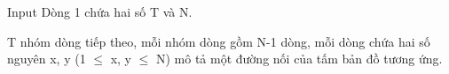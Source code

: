 Input
Dòng 1 chứa hai số T và N.  

   T nhóm dòng tiếp theo, mỗi nhóm dòng gồm N-1 dòng, mỗi dòng chứa hai số nguyên x, y (1  $\le$  x, y  $\le$  N) mô tả một đường nối của tấm bản đồ tương ứng.